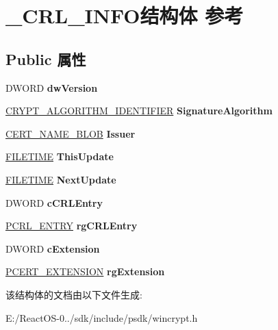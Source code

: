 \hypertarget{struct___c_r_l___i_n_f_o}{}\section{\+\_\+\+C\+R\+L\+\_\+\+I\+N\+F\+O结构体 参考}
\label{struct___c_r_l___i_n_f_o}
\subsection*{Public 属性}
\begin{DoxyCompactItemize}
\item 
\mbox{\label{struct___c_r_l___i_n_f_o_a51a31210574f37013660f96bde428086}} 
D\+W\+O\+RD {\bfseries dw\+Version}
\item 
\mbox{\label{struct___c_r_l___i_n_f_o_acec2ad8b05dcc92740aa352dded8b68d}} 
\hyperlink{struct___c_r_y_p_t___a_l_g_o_r_i_t_h_m___i_d_e_n_t_i_f_i_e_r}{C\+R\+Y\+P\+T\+\_\+\+A\+L\+G\+O\+R\+I\+T\+H\+M\+\_\+\+I\+D\+E\+N\+T\+I\+F\+I\+ER} {\bfseries Signature\+Algorithm}
\item 
\mbox{\label{struct___c_r_l___i_n_f_o_ab86fce644f2212cf2f5b0196ba3d4c2c}} 
\hyperlink{struct___c_r_y_p_t_o_a_p_i___b_l_o_b}{C\+E\+R\+T\+\_\+\+N\+A\+M\+E\+\_\+\+B\+L\+OB} {\bfseries Issuer}
\item 
\mbox{\label{struct___c_r_l___i_n_f_o_ac46c87d1db5a3337b7b25f42dc6c229f}} 
\hyperlink{struct___f_i_l_e_t_i_m_e}{F\+I\+L\+E\+T\+I\+ME} {\bfseries This\+Update}
\item 
\mbox{\label{struct___c_r_l___i_n_f_o_a88e7bfe59fb8cde615943b30fda56968}} 
\hyperlink{struct___f_i_l_e_t_i_m_e}{F\+I\+L\+E\+T\+I\+ME} {\bfseries Next\+Update}
\item 
\mbox{\label{struct___c_r_l___i_n_f_o_a24120b00098080a3e0e87a4748caff11}} 
D\+W\+O\+RD {\bfseries c\+C\+R\+L\+Entry}
\item 
\mbox{\label{struct___c_r_l___i_n_f_o_a07d5097b671ba751db94d57087c28e63}} 
\hyperlink{struct___c_r_l___e_n_t_r_y}{P\+C\+R\+L\+\_\+\+E\+N\+T\+RY} {\bfseries rg\+C\+R\+L\+Entry}
\item 
\mbox{\label{struct___c_r_l___i_n_f_o_a3426d75bd99902e47df5b4a924e1689b}} 
D\+W\+O\+RD {\bfseries c\+Extension}
\item 
\mbox{\label{struct___c_r_l___i_n_f_o_aed5e92f1cac642901095f04a97fe87cd}} 
\hyperlink{struct___c_e_r_t___e_x_t_e_n_s_i_o_n}{P\+C\+E\+R\+T\+\_\+\+E\+X\+T\+E\+N\+S\+I\+ON} {\bfseries rg\+Extension}
\end{DoxyCompactItemize}


该结构体的文档由以下文件生成\+:\begin{DoxyCompactItemize}
\item 
E\+:/\+React\+O\+S-\/0../sdk/include/psdk/wincrypt.\+h\end{DoxyCompactItemize}
